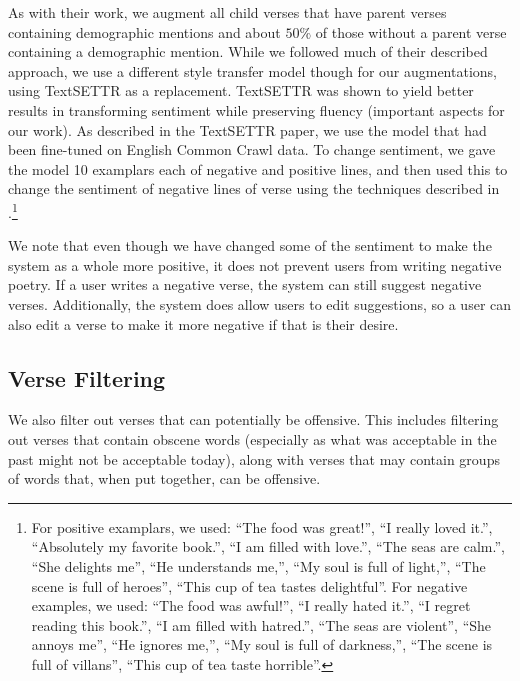 \documentclass[11pt]{article}
\begin{document}
As with their work, we augment all child verses that have parent verses containing demographic mentions and about $50\%$ of those without a parent verse containing a demographic mention.
While we followed much of their described approach, we use a different style transfer model though for our augmentations, using TextSETTR \cite{riley20} as a replacement.
TextSETTR was shown to yield better results in transforming sentiment while preserving fluency (important aspects for our work).
As described in the TextSETTR paper, we use the model that had been fine-tuned on English Common Crawl data.
To change sentiment, we gave the model 10 examplars each of negative and positive lines, and then used this to change the sentiment of negative lines of verse using the techniques described in .\footnote{
For positive examplars, we used:
``The food was great!'',
``I really loved it.'',
``Absolutely my favorite book.'',
``I am filled with love.'',
``The seas are calm.'',
``She delights me'',
``He understands me,'',
``My soul is full of light,'',
``The scene is full of heroes'',
``This cup of tea tastes delightful''.
For negative examples, we used:
``The food was awful!'',
``I really hated it.'',
``I regret reading this book.'',
``I am filled with hatred.'',
``The seas are violent'',
``She annoys me'',
``He ignores me,'',
``My soul is full of darkness,'',
``The scene is full of villans'',
``This cup of tea taste horrible''.
}

We note that even though we have changed some of the sentiment to make the system as a whole more positive, it does not prevent users from writing negative poetry.
If a user writes a negative verse, the system can still suggest negative verses.
Additionally, the system does allow users to edit suggestions, so a user can also edit a verse to make it more negative if that is their desire.

\subsection*{Verse Filtering}

We also filter out verses that can potentially be offensive.
This includes filtering out verses that contain obscene words (especially as what was acceptable in the past might not be acceptable today), along with verses that may contain groups of words that, when put together, can be offensive.
\end{document}
